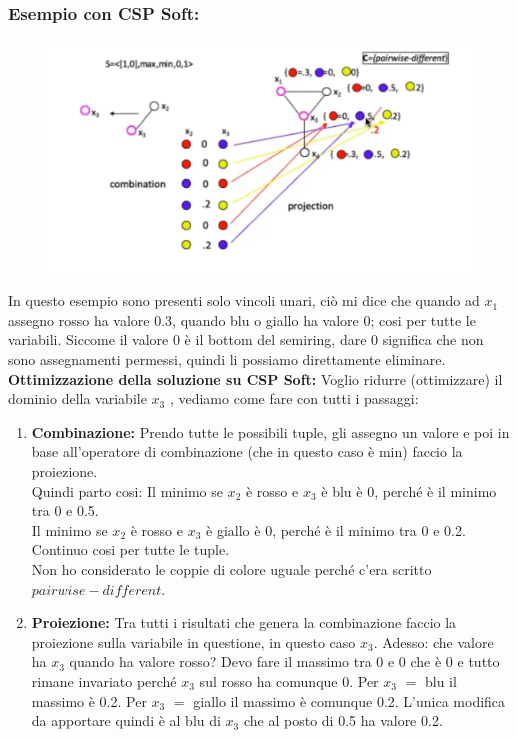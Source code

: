 \subsubsection{Esempio con CSP Soft:}
\begin{figure}[H]
    \centering
    \includegraphics[width=14cm, keepaspectratio]{img/Cap5/Local.png}
\end{figure}
\noindent In questo esempio sono presenti solo vincoli unari, ciò mi dice che
quando ad $x_1$  assegno rosso ha valore 0.3, quando blu o giallo ha valore
0; cosi per tutte le variabili. Siccome il valore 0 è il bottom del semiring,
dare 0 significa che non sono assegnamenti permessi, quindi li possiamo
direttamente eliminare.\\
\textbf{Ottimizzazione della soluzione su CSP Soft: } Voglio ridurre
(ottimizzare) il dominio della variabile $x_3$ , vediamo come fare con tutti i
passaggi:
\begin{enumerate}
    \item \textbf{Combinazione:} Prendo tutte le possibili tuple, gli assegno un
          valore e poi in base all'operatore di combinazione (che in questo caso
          è min) faccio la proiezione. \\Quindi parto cosi: Il minimo se $x_2$ è
          rosso e $x_3$ è blu è 0, perché è il minimo tra 0 e 0.5. \\Il minimo
          se $x_2$ è rosso e $x_3$ è giallo è 0, perché è il minimo tra 0 e 0.2.
          \\Continuo cosi per tutte le tuple. \\Non ho considerato le coppie di
          colore uguale perché c'era scritto $pairwise-different$.
    \item \textbf{Proiezione:} Tra tutti i risultati che genera la combinazione
          faccio la proiezione sulla variabile in questione, in questo caso $x_3$.
          Adesso: che valore ha $x_3$ quando ha valore rosso? Devo fare il massimo
          tra 0 e 0 che è 0 e tutto rimane invariato perché $x_3$ sul rosso ha
          comunque 0. Per $x_3$ $=$ blu il massimo è 0.2. Per $x_3$ $=$ giallo il
          massimo è comunque 0.2. L'unica modifica da apportare quindi è al blu di $x_3$
          che al posto di 0.5 ha valore 0.2.
\end{enumerate}

